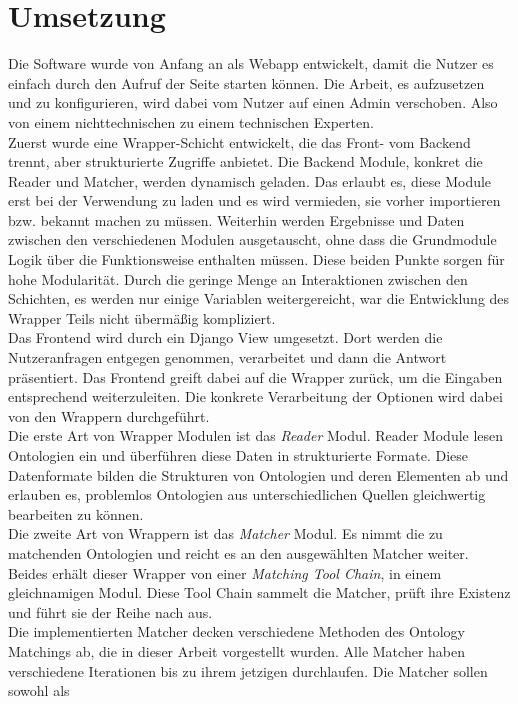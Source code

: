 \section{Umsetzung}
Die Software wurde von Anfang an als Webapp entwickelt, damit die Nutzer es
einfach durch den Aufruf der Seite starten können. Die Arbeit, es aufzusetzen
und zu konfigurieren, wird dabei vom Nutzer auf einen Admin verschoben. Also von
einem nichttechnischen zu einem technischen Experten.\\
Zuerst wurde eine Wrapper-Schicht entwickelt, die das Front- vom Backend
trennt, aber strukturierte Zugriffe anbietet. Die Backend Module, konkret die
Reader und Matcher, werden dynamisch geladen. Das erlaubt es, diese Module erst
bei der Verwendung zu laden und es wird vermieden, sie vorher importieren bzw.
bekannt machen zu müssen. Weiterhin werden Ergebnisse und Daten zwischen den
verschiedenen Modulen ausgetauscht, ohne dass die Grundmodule Logik über die
Funktionsweise enthalten müssen. Diese beiden Punkte sorgen für hohe
Modularität. Durch die geringe Menge an Interaktionen zwischen den Schichten, es
werden nur einige Variablen weitergereicht, war die Entwicklung des Wrapper
Teils nicht übermäßig kompliziert.\\
Das Frontend wird durch ein Django View umgesetzt. Dort werden die
Nutzeranfragen entgegen genommen, verarbeitet und dann die Antwort
präsentiert. Das Frontend greift dabei auf die Wrapper zurück, um die Eingaben
entsprechend weiterzuleiten. Die konkrete Verarbeitung der Optionen wird dabei
von den Wrappern durchgeführt.\\
Die erste Art von Wrapper Modulen ist das \textit{Reader} Modul. Reader Module
lesen Ontologien ein und überführen diese Daten in strukturierte Formate.
Diese Datenformate bilden die Strukturen von Ontologien und deren Elementen ab
und erlauben es, problemlos Ontologien aus unterschiedlichen Quellen
gleichwertig bearbeiten zu können.\\
Die zweite Art von Wrappern ist das \textit{Matcher} Modul. Es nimmt die zu
matchenden Ontologien und reicht es an den ausgewählten Matcher weiter. Beides erhält
dieser Wrapper von einer \textit{Matching Tool Chain}, in einem
gleichnamigen Modul. Diese Tool Chain sammelt die Matcher, prüft ihre
Existenz und führt sie der Reihe nach aus.\\
Die implementierten Matcher decken verschiedene Methoden des Ontology Matchings
ab, die in dieser Arbeit vorgestellt wurden. Alle Matcher haben verschiedene
Iterationen bis zu ihrem jetzigen durchlaufen. Die Matcher sollen sowohl als
